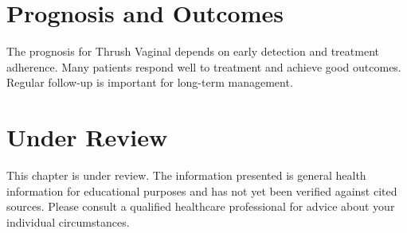 \section*{Prognosis and Outcomes}
The prognosis for Thrush Vaginal depends on early detection and treatment adherence. Many patients respond well to treatment and achieve good outcomes. Regular follow-up is important for long-term management.
\section*{Under Review}
This chapter is under review. The information presented is general health information for educational purposes and has not yet been verified against cited sources. Please consult a qualified healthcare professional for advice about your individual circumstances.


\clearpage
